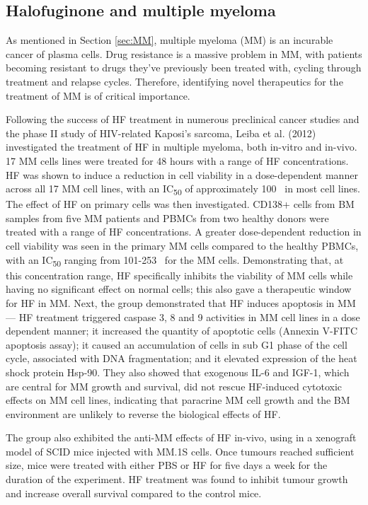 \subsection{Halofuginone and multiple myeloma}\label{subsec:HF_MM}

As mentioned in Section \ref{sec:MM}, multiple myeloma (MM) is an incurable cancer of plasma cells.
Drug resistance is a massive problem in MM, with patients becoming resistant to drugs they've previously been treated with, cycling through treatment and relapse cycles.
Therefore, identifying novel therapeutics for the treatment of MM is of critical importance.

Following the success of HF treatment in numerous preclinical cancer studies and the phase II study of HIV-related Kaposi's sarcoma\cite{koon2011phase}, Leiba et al. (2012) investigated the treatment of HF in multiple myeloma, both in-vitro and in-vivo\cite{leiba2012halofuginone}.
17 MM cells lines were treated for 48 hours with a range of HF concentrations.
HF was shown to induce a reduction in cell viability in a dose-dependent manner across all 17 MM cell lines, with an IC\textsubscript{50} of approximately 100\si{\nano\Molar} in most cell lines.
The effect of HF on primary cells was then investigated.
CD138+ cells from BM samples from five MM patients and PBMCs from two healthy donors were treated with a range of HF concentrations.
A greater dose-dependent reduction in cell viability was seen in the primary MM cells compared to the healthy PBMCs, with an IC\textsubscript{50} ranging from 101-253\si{\nano\Molar} for the MM cells.
Demonstrating that, at this concentration range, HF specifically inhibits the viability of MM cells while having no significant effect on normal cells; this also gave a therapeutic window for HF in MM.
Next, the group demonstrated that HF induces apoptosis in MM--- HF treatment triggered caspase 3, 8 and 9 activities in MM cell lines in a dose dependent manner; it increased the quantity of apoptotic cells (Annexin V-FITC apoptosis assay); it caused an accumulation of cells in sub G1 phase of the cell cycle, associated with DNA fragmentation; and it elevated expression of the heat shock protein Hsp-90.
They also showed that exogenous IL-6 and IGF-1, which are central for MM growth and survival, did not rescue HF-induced cytotoxic effects on MM cell lines, indicating that paracrine MM cell growth and the BM environment are unlikely to reverse the biological effects of HF.

The group also exhibited the anti-MM effects of HF in-vivo, using in a xenograft model of SCID mice injected with MM.1S cells.
Once tumours reached sufficient size, mice were treated with either PBS or HF for five days a week for the duration of the experiment.
HF treatment was found to inhibit tumour growth and increase overall survival compared to the control mice.

